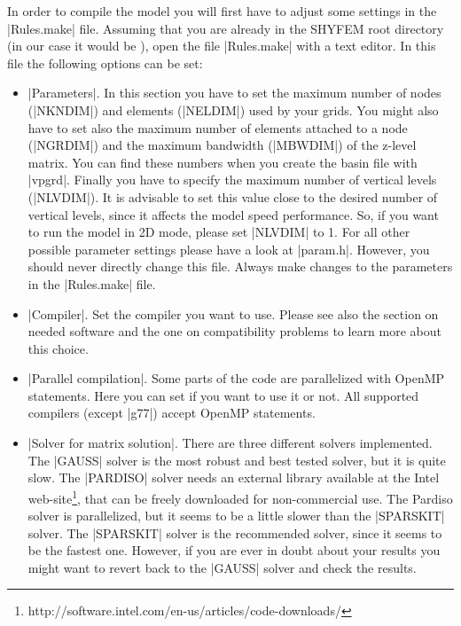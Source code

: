 
In order to compile the model you will first have to adjust some settings
in the |Rules.make| file. Assuming that you are already in the SHYFEM
root directory (in our case it would be \ttt{\shydir}), open the file
|Rules.make| with a text editor.  In this file the following options
can be set:

\begin{itemize}

\item |Parameters|. In this section you have to set the maximum number
of nodes (|NKNDIM|) and elements (|NELDIM|) used by your grids. You
might also have to set also the maximum number of elements attached to
a node (|NGRDIM|) and the maximum bandwidth (|MBWDIM|) of the z-level
matrix. You can find these numbers when you create the basin file with
|vpgrd|. Finally you have to specify the maximum number of vertical levels
(|NLVDIM|).  It is advisable to set this value close to the desired number
of vertical levels, since it affects the model speed performance. So,
if you want to run the model in 2D mode, please set |NLVDIM| to 1.
For all other possible parameter settings please have a look at |param.h|.
However, you should never directly change this file. Always make changes
to the parameters in the |Rules.make| file.

\item |Compiler|. Set the compiler you want to use. Please see also
the section on needed software and the one on compatibility problems to
learn more about this choice.

\item |Parallel compilation|. Some parts of the code are parallelized
with OpenMP statements. Here you can set if you want to use it or not.
All supported compilers (except |g77|) accept OpenMP statements.

\item |Solver for matrix solution|. There are three
different solvers implemented.  The |GAUSS| solver is the
most robust and best tested solver, but it is quite slow. The
|PARDISO| solver needs an external library available at the Intel
web-site\footnote{http://software.intel.com/en-us/articles/code-downloads/},
that can be freely downloaded for non-commercial use.  The Pardiso
solver is parallelized, but it seems to be a little slower than the
|SPARSKIT| solver.  The |SPARSKIT| solver is the recommended solver,
since it seems to be the fastest one. However, if you are ever in doubt
about your results you might want to revert back to the |GAUSS| solver
and check the results.


\end{itemize}
